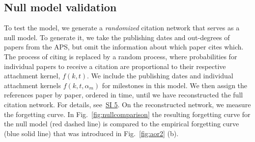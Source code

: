 \documentclass[fleqn,10pt]{wlscirep}
\begin{document}
\subsection*{Null model validation} To test the model, we generate a {\em randomized} citation network that serves as a null model. To generate it, we take the publishing dates and out-degrees of papers from the APS, but omit the information about which paper cites which. The process of citing is replaced by a random process, where probabilities for individual papers to receive a citation are proportional to their respective attachment kernel, $f(k, t)$. We include the publishing dates and individual attachment kernels $f(k, t, \alpha_m)$ for milestones in this model. We then assign the references paper by paper, ordered in time, until we have reconstructed the full citation network. For details, see~\hyperref[SI5]{SI 5}. On the reconstructed network, we measure the forgetting curve. In Fig.~\ref{fig:nullcomparison} the resulting forgetting curve for the null model (red dashed line) is compared to the empirical forgetting curve  (blue solid line) that was introduced in Fig.~\ref{fig:aor2} (b). 
\end{document}
